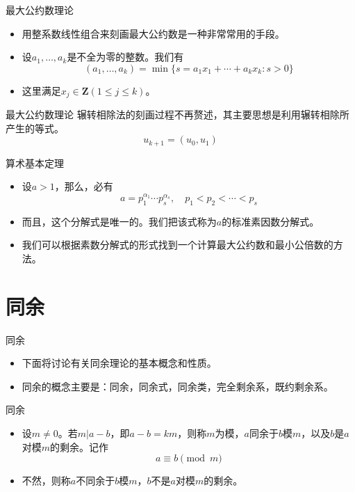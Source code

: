 \documentclass[dvipdfmx]{beamer}
\newcommand{\Z}{\boldsymbol{Z}}
\begin{document}
\begin{frame}{最大公约数理论}
\begin{itemize}
\item 用整系数线性组合来刻画最大公约数是一种非常常用的手段。
\item 设$a_1,\dotsc,a_k$是不全为零的整数。我们有
\begin{displaymath}
(a_1,\dotsc,a_k)=\min\{s=a_1x_1+\dotsb+a_k x_k : s>0\}
\end{displaymath}
\item 这里满足$x_j\in \Z(1\leq j\leq k)$。
\end{itemize}
\end{frame}

\begin{frame}{最大公约数理论}
辗转相除法的刻画过程不再赘述，其主要思想是利用辗转相除所产生的等式。
\begin{displaymath}
u_{k+1}=(u_0,u_1)
\end{displaymath}
\end{frame}

\begin{frame}{算术基本定理}
\begin{itemize}
\item 设$a>1$，那么，必有
\begin{displaymath}
a=p_1^{\alpha_1} \dotsm p_s^{\alpha_s},\quad p_1<p_2<\dotsb<p_s
\end{displaymath}
\item 而且，这个分解式是唯一的。我们把该式称为$a$的标准素因数分解式。
\item 我们可以根据素数分解式的形式找到一个计算最大公约数和最小公倍数的方法。
\end{itemize}
\end{frame}

\section{同余}

\begin{frame}{同余}
\begin{itemize}
\item 下面将讨论有关同余理论的基本概念和性质。
\item 同余的概念主要是：同余，同余式，同余类，完全剩余系，既约剩余系。
\end{itemize}
\end{frame}

\begin{frame}{同余}
\begin{itemize}
\item 设$m\neq 0$。若$m|a−b$，即$a−b=km$，则称$m$为模，$a$同余于$b$模$m$，以及$b$是$a$对模$m$的剩余。记作
\begin{displaymath}
a\equiv b\pmod{m}
\end{displaymath}
\item 不然，则称$a$不同余于$b$模$m$，$b$不是$a$对模$m$的剩余。
\end{itemize}
\end{frame}
\end{document}
